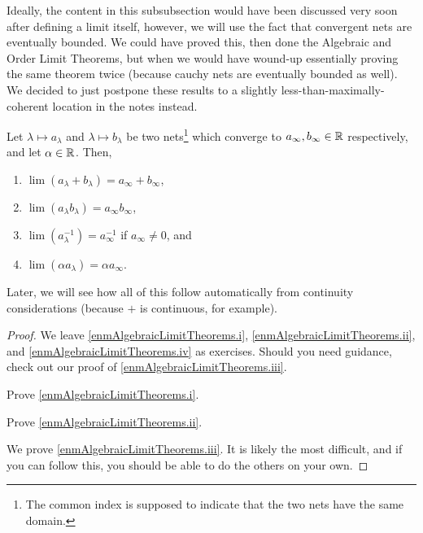 Ideally, the content in this subsubsection would have been discussed very soon after defining a limit itself, however, we will use the fact that convergent nets are eventually bounded.  We could have proved this, then done the Algebraic and Order Limit Theorems, but when we would have wound-up essentially proving the same theorem twice (because cauchy nets are eventually bounded as well).  We decided to just postpone these results to a slightly less-than-maximally-coherent location in the notes instead.
\begin{prp}\label{AlgebraicLimitTheorems}
Let $\lambda \mapsto a_\lambda$ and $\lambda \mapsto b_\lambda$ be two nets\footnote{The common index is supposed to indicate that the two nets have the same domain.} which converge to $a_\infty,b_\infty\in \mathbb{R}$ respectively, and let $\alpha \in \mathbb{R}$.  Then,
\begin{enumerate}
\item \label{enmAlgebraicLimitTheorems.i}$\lim (a_\lambda +b_\lambda )=a_\infty+b_\infty$,
\item \label{enmAlgebraicLimitTheorems.ii}$\lim (a_\lambda b_\lambda )=a_\infty b_\infty$,
\item \label{enmAlgebraicLimitTheorems.iii}$\lim (a_\lambda ^{-1})=a_\infty ^{-1}$ if $a_\infty \neq 0$, and
\item \label{enmAlgebraicLimitTheorems.iv}$\lim (\alpha a_\lambda )=\alpha a_\infty$.
\end{enumerate}
\begin{rmk}
Later, we will see how all of this follow automatically from continuity considerations (because $+$ is continuous, for example).
\end{rmk}
\begin{proof}
We leave \ref{enmAlgebraicLimitTheorems.i}, \ref{enmAlgebraicLimitTheorems.ii}, and \ref{enmAlgebraicLimitTheorems.iv} as exercises.  Should you need guidance, check out our proof of \ref{enmAlgebraicLimitTheorems.iii}.
\begin{exr}
Prove \ref{enmAlgebraicLimitTheorems.i}.
\end{exr}
\begin{exr}
Prove \ref{enmAlgebraicLimitTheorems.ii}.
\end{exr}
We prove \ref{enmAlgebraicLimitTheorems.iii}.  It is likely the most difficult, and if you can follow this, you should be able to do the others on your own.


\end{proof}
\end{prp}
